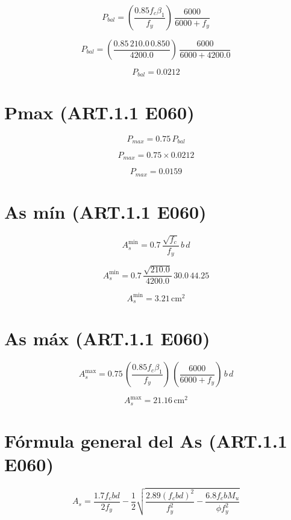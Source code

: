 \documentclass[12pt]{article}
\begin{document}
\[
P_{bal}=\left(\frac{0.85 f_c \beta_1}{f_y}\right)\,\frac{6000}{6000+f_y}
\]

\[
P_{bal}=\left(\frac{0.85\,210.0\,0.850}{4200.0}\right)\,\frac{6000}{6000+4200.0}
\]

\[
P_{bal} = 0.0212
\]

\vspace{0.5cm}

\section*{ Pmax (ART.1.1 E060) }

\[
P_{max}=0.75\,P_{bal}
\]

\[
P_{max}=0.75\times0.0212
\]

\[
P_{max} = 0.0159
\]

\vspace{0.5cm}

\section*{ As mín (ART.1.1 E060) }

\[
A_s^{\text{min}} = 0.7\,\frac{\sqrt{f_c}}{f_y}\, b\, d
\]

\[
A_s^{\text{min}} = 0.7\,\frac{\sqrt{210.0}}{4200.0}\,30.0\,44.25
\]

\[
A_s^{\text{min}} = 3.21\,\text{cm}^2
\]

\vspace{0.5cm}

\section*{ As máx (ART.1.1 E060) }

\[
A_s^{\text{max}} = 0.75\,\left(\frac{0.85 f_c \beta_1}{f_y}\right)\,\left(\frac{6000}{6000+f_y}\right)\,b\,d
\]

\[
A_s^{\text{max}} = 21.16\,\text{cm}^2
\]

\vspace{0.5cm}

\section*{ Fórmula general del As (ART.1.1 E060) }

\[
A_s = \frac{1.7 f_c b d}{2 f_y} - \frac{1}{2} \sqrt{\frac{2.89(f_c b d)^2}{f_y^2} - \frac{6.8 f_c b M_u}{\phi f_y^2}}
\]

\vspace{0.5cm}
\end{document}
